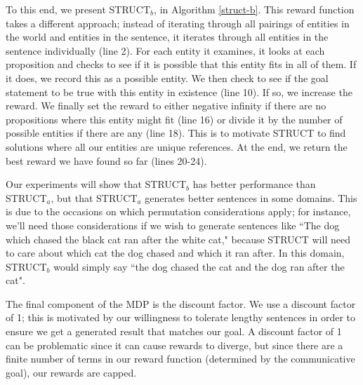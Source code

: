To this end, we present STRUCT$_b$, in Algorithm \ref{struct-b}.
This reward function takes a different approach; instead of iterating through
all pairings of entities in the world and entities in the sentence, it iterates
through all entities in the sentence individually (line 2).  For each entity it
examines, it looks at each proposition and checks to see if it is possible
that this entity fits in all of them.  If it does, we record this as a possible
entity.  We then check to see if the goal statement
to be true with this entity in existence (line 10).  If so, we increase the
reward.  We finally set the reward to either negative infinity if there are
no propositions where this entity might fit (line 16) or divide it by the number
of possible entities if there are any (line 18).  This is to motivate STRUCT to
find solutions where all our entities are unique references.  At the end,
we return the best reward we have found so far (lines 20-24).

Our experiments will show that STRUCT$_b$
has better performance than STRUCT$_a$, but that STRUCT$_a$ generates better
sentences in some domains.  This is due to the occasions on which
permutation considerations apply; for instance, we'll need those considerations
if we wish to generate sentences like ``The dog which chased the black cat ran
after the white cat," because STRUCT will need to care about which cat the dog
chased and which it ran after.  In this domain, STRUCT$_b$ would simply say
``the dog chased the cat and the dog ran after the cat".

The final component of the MDP is the discount factor.  We use a
discount factor of 1; this is motivated by our willingness to tolerate
lengthy sentences in order to ensure we get a generated result
that matches our goal.  A discount factor of 1 can be problematic
since it can cause rewards to diverge, but since there are a finite
number of terms in our reward function (determined by the communicative
goal), our rewards are capped.

